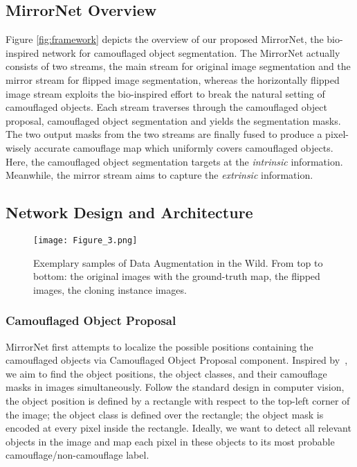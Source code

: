 \documentclass[journal]{IEEEtran}
\begin{document}
\subsection{MirrorNet Overview}

Figure \ref{fig:framework} depicts the overview of our proposed MirrorNet, the bio-inspired network for camouflaged object segmentation. The MirrorNet actually consists of two streams, the main stream for original image segmentation and the mirror stream for flipped image segmentation, whereas the horizontally flipped image stream exploits the bio-inspired  effort to break the natural setting of camouflaged objects. Each stream traverses through the camouflaged object proposal, camouflaged object segmentation and yields the segmentation masks. The two output masks from the two streams are finally fused to produce a pixel-wisely accurate camouflage map which uniformly covers camouflaged objects. Here, the camouflaged object segmentation targets at the \textit{intrinsic} information. Meanwhile, the mirror stream aims to capture the \textit{extrinsic} information.

\subsection{Network Design and Architecture}















\begin{figure*}[!t]
	\centering
	\texttt{[image: Figure\_3.png]}
	\caption{Exemplary samples of Data Augmentation in the Wild. From top to bottom: the original images with the ground-truth map, the flipped images, the cloning instance images.}
	\label{fig:aw}
\end{figure*}



\subsubsection{Camouflaged Object Proposal} 
MirrorNet first attempts to localize the possible positions containing the camouflaged objects via Camouflaged Object Proposal component. Inspired by~\cite{Ren-NIPS2015}, we aim to find the object positions, the object classes, and their camouflage masks in images simultaneously. Follow the standard design in computer vision, the object position is defined by a rectangle with respect to the top-left corner of the image; the object class is defined over the rectangle; the object mask is encoded at every pixel inside the rectangle. Ideally, we want to detect all relevant objects in the image and map each pixel in these objects to its most probable camouflage/non-camouflage label. 
\end{document}
